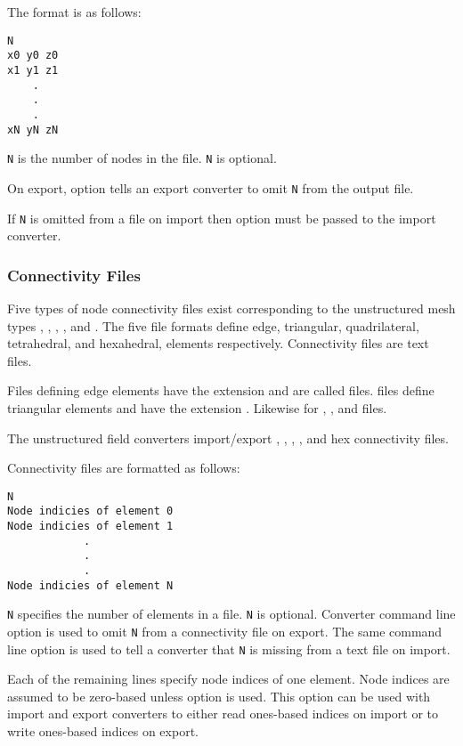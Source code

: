 The format is as follows:

\begin{verbatim}
N
x0 y0 z0
x1 y1 z1
    .
    .
    .
xN yN zN
\end{verbatim}

\verb|N| is the number of nodes in the file.  \verb|N| is optional.

On export, option  tells an export converter to
omit \verb|N| from the output file.

If \verb|N| is omitted from a file on import then option
 must be passed to the import converter.


\subsubsection{Connectivity Files}
\label{sec:node_conn_fmt}

Five types of node connectivity files exist corresponding to the
unstructured mesh types , ,
, , and
.  The five file formats define
edge, triangular, quadrilateral, tetrahedral, and hexahedral,
elements respectively.  Connectivity files are text files.

Files defining edge elements have the extension  and
are called  files.   files define triangular
elements and have the extension .  Likewise for
, , and  files.

The unstructured field converters import/export ,
, , , and hex connectivity
files.

Connectivity files are formatted as follows:

\begin{verbatim}
N
Node indicies of element 0
Node indicies of element 1
            .
            .
            .
Node indicies of element N
\end{verbatim}

\verb|N| specifies the number of elements in a file.  \verb|N| is
optional.  Converter command line option  is
used to omit \verb|N| from a connectivity file on export.  The same
command line option is used to tell a converter that \verb|N| is
missing from a text file on import.

Each of the remaining lines specify node indices of one element.
Node indices are assumed to be zero-based unless option
 is used.  This option can be used with
import and export converters to either read ones-based indices on
import or to write ones-based indices on export.

